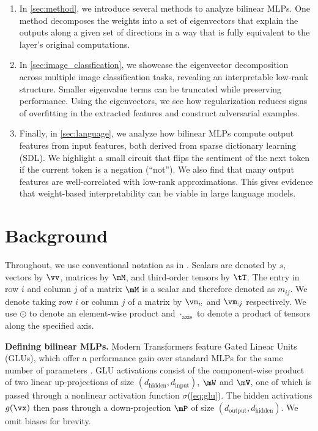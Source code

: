 \documentclass{article} %
\begin{document}
\begin{enumerate}
    \item In \autoref{sec:method}, we introduce several methods to analyze bilinear MLPs. One method decomposes the weights into a set of eigenvectors that explain the outputs along a given set of directions in a way that is fully equivalent to the layer's original computations.
    \item In \autoref{sec:image_classfication}, we showcase the eigenvector decomposition across multiple image classification tasks, revealing an interpretable low-rank structure. Smaller eigenvalue terms can be truncated while preserving performance. Using the eigenvectors, we see how regularization reduces signs of overfitting in the extracted features and construct adversarial examples.
    \item Finally, in \autoref{sec:language}, we analyze how bilinear MLPs compute output features from input features, both derived from sparse dictionary learning (SDL). We highlight a small circuit that flips the sentiment of the next token if the current token is a negation (``not''). We also find that many output features are well-correlated with low-rank approximations. This gives evidence that weight-based interpretability can be viable in large language models.
\end{enumerate}

\section{Background} \label{sec:background} \label{sub:symmetry}
Throughout, we use conventional notation as in \citet{goodfellow2016deep}. Scalars are denoted by $s$, vectors by $\vv$, matrices by $\mM$, and third-order tensors by $\tT$. The entry in row $i$ and column $j$ of a matrix $\mM$ is a scalar and therefore denoted as $m_{ij}$. We denote taking row $i$ or column $j$ of a matrix by $\vm_{i:}$ and $\vm_{:j}$ respectively. We use $\odot$ to denote an element-wise product and $\cdot_\text{axis}$ to denote a product of tensors along the specified axis.

\textbf{Defining bilinear MLPs.} Modern Transformers \citep{llama2} feature Gated Linear Units (GLUs), which offer a performance gain over standard MLPs for the same number of parameters \citep{shazeer2020glu, dauphin2017language}. GLU activations consist of the component-wise product of two linear up-projections of size $(d_\text{hidden}, d_\text{input})$, $\mW$ and $\mV$, one of which is passed through a nonlinear activation function $\sigma$(\autoref{eq:glu}). The hidden activations $g(\vx)$ then pass through a down-projection $\mP$ of size $(d_\text{output}, d_\text{hidden})$. We omit biases for brevity.
\end{document}
